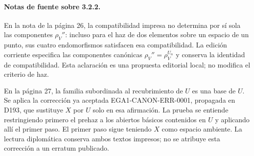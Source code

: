 \paragraph{Notas de fuente sobre 3.2.2.}
En la nota de la página 26, la compatibilidad impresa no determina por sí sola las componentes $\rho_V''$: incluso para el haz de dos elementos sobre un espacio de un punto, sus cuatro endomorfismos satisfacen esa compatibilidad. La edición corriente especifica las componentes canónicas $\rho_V''=\rho_V^{U_\alpha}$ y conserva la identidad de compatibilidad. Esta aclaración es una propuesta editorial local; no modifica el criterio de haz.

En la página 27, la familia subordinada al recubrimiento de $U$ es una base de $U$. Se aplica la corrección ya aceptada EGA1-CANON-ERR-0001, propagada en D193, que sustituye $X$ por $U$ solo en esa afirmación. La prueba se entiende restringiendo primero el prehaz a los abiertos básicos contenidos en $U$ y aplicando allí el primer paso. El primer paso sigue teniendo $X$ como espacio ambiente. La lectura diplomática conserva ambos textos impresos; no se atribuye esta corrección a un erratum publicado.
